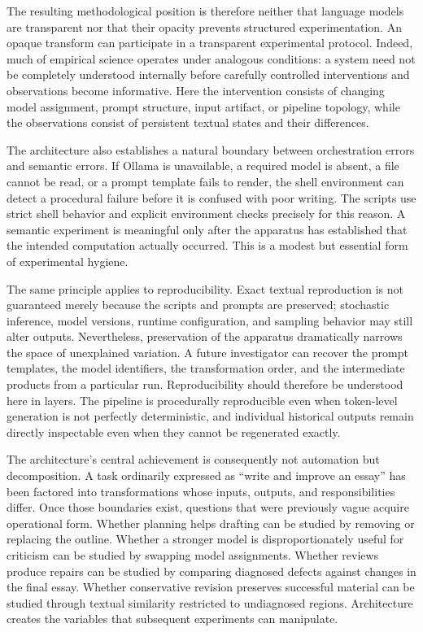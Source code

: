 \documentclass[11pt]{article}
\begin{document}
The resulting methodological position is therefore neither that language models are transparent nor that their opacity prevents structured experimentation. An opaque transform can participate in a transparent experimental protocol. Indeed, much of empirical science operates under analogous conditions: a system need not be completely understood internally before carefully controlled interventions and observations become informative. Here the intervention consists of changing model assignment, prompt structure, input artifact, or pipeline topology, while the observations consist of persistent textual states and their differences.

The architecture also establishes a natural boundary between orchestration errors and semantic errors. If Ollama is unavailable, a required model is absent, a file cannot be read, or a prompt template fails to render, the shell environment can detect a procedural failure before it is confused with poor writing. The scripts use strict shell behavior and explicit environment checks precisely for this reason. A semantic experiment is meaningful only after the apparatus has established that the intended computation actually occurred. This is a modest but essential form of experimental hygiene.

The same principle applies to reproducibility. Exact textual reproduction is not guaranteed merely because the scripts and prompts are preserved; stochastic inference, model versions, runtime configuration, and sampling behavior may still alter outputs. Nevertheless, preservation of the apparatus dramatically narrows the space of unexplained variation. A future investigator can recover the prompt templates, the model identifiers, the transformation order, and the intermediate products from a particular run. Reproducibility should therefore be understood here in layers. The pipeline is procedurally reproducible even when token-level generation is not perfectly deterministic, and individual historical outputs remain directly inspectable even when they cannot be regenerated exactly.

The architecture's central achievement is consequently not automation but decomposition. A task ordinarily expressed as ``write and improve an essay'' has been factored into transformations whose inputs, outputs, and responsibilities differ. Once those boundaries exist, questions that were previously vague acquire operational form. Whether planning helps drafting can be studied by removing or replacing the outline. Whether a stronger model is disproportionately useful for criticism can be studied by swapping model assignments. Whether reviews produce repairs can be studied by comparing diagnosed defects against changes in the final essay. Whether conservative revision preserves successful material can be studied through textual similarity restricted to undiagnosed regions. Architecture creates the variables that subsequent experiments can manipulate.
\end{document}
